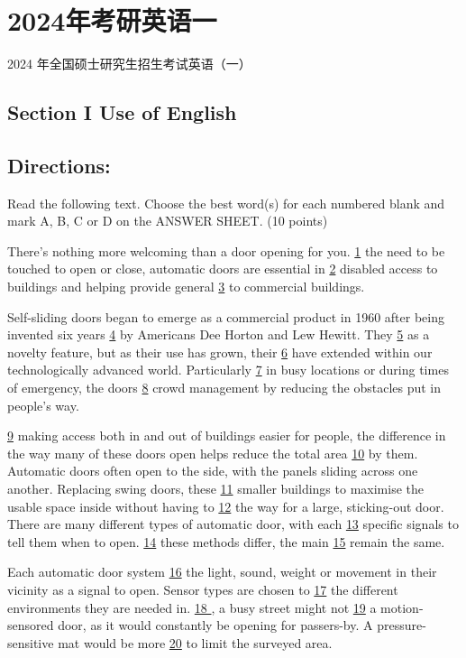\documentclass[UTF8,11pt]{ctexart}
\begin{document}
\section*{2024年考研英语一}
2024 年全国硕士研究生招生考试英语（一）


\subsection*{\textbf{Section I Use of English}}


\subsection*{\textbf{Directions:}}


Read the following text. Choose the best word(s) for each numbered blank and mark A, B, C or D on the ANSWER SHEET. (10 points)


There’s nothing more welcoming than a door opening for you. \uline{1} the need to be touched to open or close, automatic doors are essential in \uline{2} disabled access to buildings and helping provide general \uline{3} to commercial buildings.


Self-sliding doors began to emerge as a commercial product in 1960 after being invented six years \uline{4} by Americans Dee Horton and Lew Hewitt. They \uline{5} as a novelty feature, but as their use has grown, their \uline{6} have extended within our technologically advanced world. Particularly \uline{7} in busy locations or during times of emergency, the doors \uline{8} crowd management by reducing the obstacles put in people’s way.


\uline{9} making access both in and out of buildings easier for people, the difference in the way many of these doors open helps reduce the total area \uline{10} by them. Automatic doors often open to the side, with the panels sliding across one another. Replacing swing doors, these \uline{11} smaller buildings to maximise the usable space inside without having to \uline{12} the way for a large, sticking-out door. There are many different types of automatic door, with each \uline{13} specific signals to tell them when to open. \uline{14} these methods differ, the main \uline{15} remain the same.


Each automatic door system \uline{16} the light, sound, weight or movement in their vicinity as a signal to open. Sensor types are chosen to \uline{17} the different environments they are needed in. \uline{18 }, a busy street might not \uline{19} a motion-sensored door, as it would constantly be opening for passers-by. A pressure-sensitive mat would be more \uline{20} to limit the surveyed area.
\end{document}
